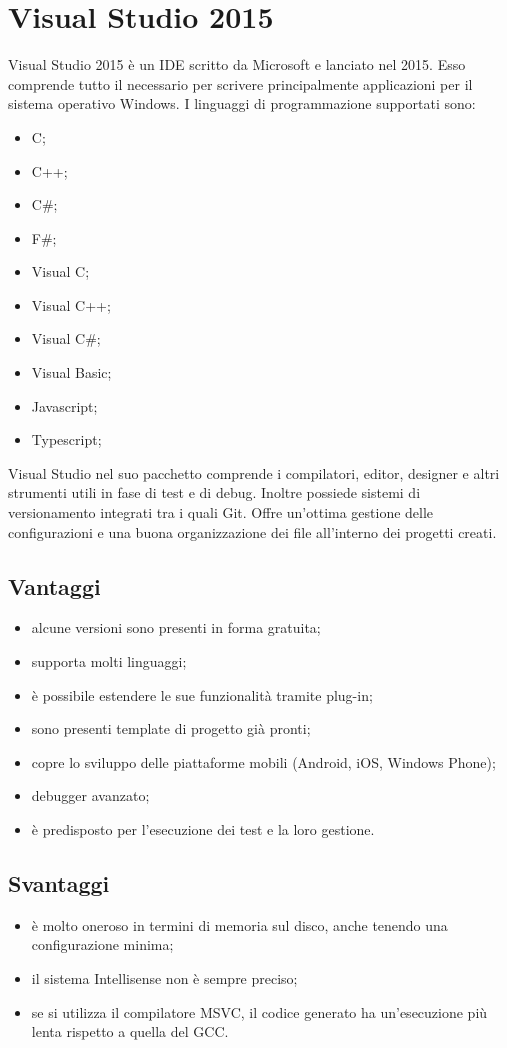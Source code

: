 \section{Visual Studio 2015}
Visual Studio 2015 è un IDE scritto da Microsoft e lanciato nel 2015. Esso comprende tutto il necessario per scrivere principalmente applicazioni per il sistema operativo Windows. 
I linguaggi di programmazione supportati sono:
\begin{itemize}
	\item C;
	\item C++;
	\item C\#;
	\item F\#;
	\item Visual C;
	\item Visual C++;
	\item Visual C\#;
	\item Visual Basic;
	\item Javascript;
	\item Typescript;
\end{itemize}
Visual Studio nel suo pacchetto comprende i compilatori, editor, designer e altri strumenti utili in fase di test e di debug. Inoltre possiede sistemi di versionamento integrati tra i quali Git.
Offre un'ottima gestione delle configurazioni e una buona organizzazione dei file all'interno dei progetti creati.
\subsection*{Vantaggi}
\begin{itemize}
	\item alcune versioni sono presenti in forma gratuita;
	\item supporta molti linguaggi;
	\item è possibile estendere le sue funzionalità tramite plug-in;
	\item sono presenti template di progetto già pronti;
	\item copre lo sviluppo delle piattaforme mobili (Android, iOS, Windows Phone);
	\item debugger avanzato;
	\item è predisposto per l'esecuzione dei test e la loro gestione.
\end{itemize}
\subsection*{Svantaggi}
\begin{itemize}
	\item è molto oneroso in termini di memoria sul disco, anche tenendo una configurazione minima;
	\item il sistema Intellisense non è sempre preciso;
	\item se si utilizza il compilatore MSVC, il codice generato ha un'esecuzione più lenta rispetto a quella del GCC.
\end{itemize}



 